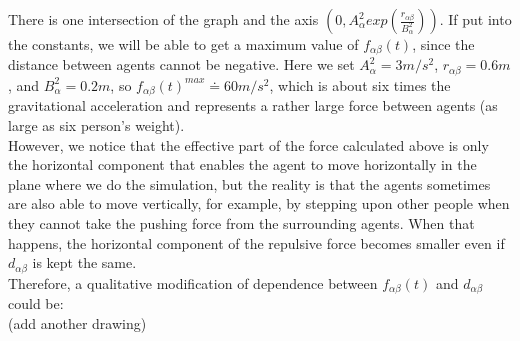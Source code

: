 There is one intersection of the graph and the axis 
$ \left( 0, A_{\alpha}^{2} exp\left( \frac{r_{\alpha\beta} }{B_{\alpha}^{2}}\right)  \right)  $. 
If put into the constants, we will be able to get a maximum value of $ f_{\alpha\beta}(t) $, 
since the distance between agents cannot be negative. Here we set 
$ A_{\alpha}^{2} = 3 m/s^{2} $, $ r_{\alpha\beta} = 0.6 m $, and 
$ B_{\alpha}^{2} = 0.2 m $, so $ f_{\alpha\beta}(t)^{max} \doteq 60 m/s^{2} $, 
which is about six times the gravitational acceleration and represents a rather large force between 
agents (as large as six person's weight).\\
However, we notice that the effective part of the force calculated above is only the horizontal 
component that enables the agent to move horizontally in the plane where we do the simulation, 
but the reality is that the agents sometimes are also able to move vertically, for example, 
by stepping upon other people when they cannot take the pushing force from the surrounding agents. 
When that happens, the horizontal component of the repulsive force becomes smaller even if $ d_{\alpha\beta} $ 
is kept the same.\\	%
Therefore, a qualitative modification of dependence between $ f_{\alpha\beta}(t) $ and $ d_{\alpha\beta} $ could be:\\
(add another drawing)

